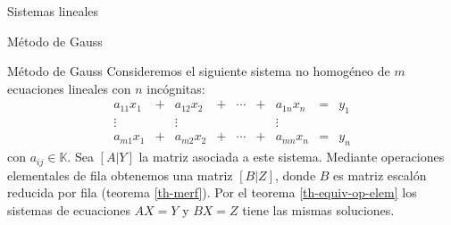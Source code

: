 \documentclass[a4paper,12pt,twoside,spanish,reqno]{amsbook}
\theoremstyle{definition}
\theoremstyle{remark}
\newcommand{\K}{\mathbb K}
\begin{document}
\begin{chapter}{Sistemas lineales}
\begin{section}{Método de Gauss }
            
            \begin{subsection}{Método de Gauss} Consideremos el siguiente sistema no homogéneo de $m$ ecuaciones lineales con $n$ incógnitas:
                \begin{equation*}
                \begin{matrix}
                a_{11}x_1& + &a_{12}x_2& + &\cdots& + &a_{1n}x_n &= &y_1\\
                \vdots&  &\vdots& &&  &\vdots \\
                a_{m1}x_1& + &a_{m2}x_2& + &\cdots& + &a_{mn}x_n &=&y_n
                \end{matrix}
                \end{equation*}
                con $a_{ij} \in \K$. Sea $[A | Y]$ la matriz asociada a este sistema. Mediante operaciones elementales de fila obtenemos una matriz $[B|Z]$, donde $B$ es matriz escalón reducida por fila (teorema \ref{th-merf}). Por el teorema \ref{th-equiv-op-elem} los sistemas de ecuaciones $AX=Y$ y $BX=Z$ tiene las mismas soluciones. 
                

\end{subsection}
\end{section}
\end{chapter}
\end{document}
